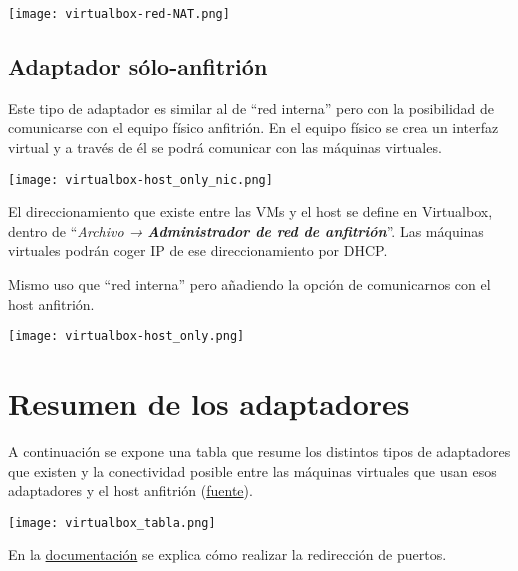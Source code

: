 \begin{center}
    \vspace{-10pt}
    \texttt{[image: virtualbox-red-NAT.png]}
    \vspace{-10pt}
    \vspace{-20pt}
\end{center}

\subsection{Adaptador sólo-anfitrión}
Este tipo de adaptador es similar al de “red interna” pero con la posibilidad de comunicarse con el equipo físico anfitrión. En el equipo físico se crea un interfaz virtual y a través de él se podrá comunicar con las máquinas virtuales.

\begin{center}
    \vspace{-10pt}
    \texttt{[image: virtualbox-host\_only\_nic.png]}
    \vspace{-20pt}
\end{center}

El direccionamiento que existe entre las VMs y el host se define en Virtualbox, dentro de “\textit{Archivo → \textbf{Administrador de red de anfitrión}}”. Las máquinas virtuales podrán coger IP de ese direccionamiento  por DHCP.

Mismo uso que “red interna” pero añadiendo la opción de comunicarnos con el host anfitrión.

\begin{center}
    \vspace{-10pt}
    \texttt{[image: virtualbox-host\_only.png]}
    \vspace{-10pt}
    \vspace{-20pt}
\end{center}

\section{Resumen de los adaptadores}
A continuación se expone una tabla que resume los distintos tipos de adaptadores que existen y la conectividad posible entre las máquinas virtuales que usan esos adaptadores y el host anfitrión (\href{https://www.virtualbox.org/manual/ch06.html#networkingmodes}{fuente}).

\begin{center}
    \vspace{-10pt}
    \texttt{[image: virtualbox\_tabla.png]}
    \vspace{-20pt}
\end{center}

En la \href{https://www.virtualbox.org/manual/ch06.html#natforward}{documentación} se explica cómo realizar la redirección de puertos.


\clearpage